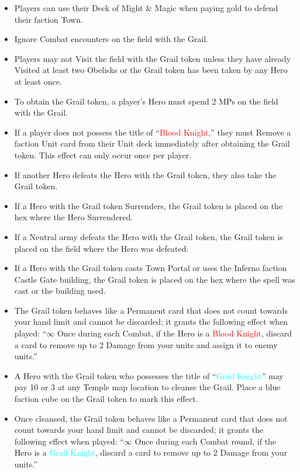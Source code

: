 \begin{multicols*}{2}
\begin{itemize}
    \item Players can use their Deck of Might \& Magic when paying gold to defend their faction Town.
    \item Ignore Combat encounters on the field with the Grail.
    \item Players may not Visit the field with the Grail token unless they have already Visited at least two Obelisks or the Grail token has been taken by any Hero at least once.
    \item To obtain the Grail token, a player’s Hero must spend 2 MPs on the field with the Grail.
    \item If a player does not possess the title of “\textcolor{red}{Blood Knight},” they must Remove a faction Unit card from their Unit deck immediately after obtaining the Grail token. This effect can only occur once per player.
    \item If another Hero defeats the Hero with the Grail token, they also take the Grail token.
    \item If a Hero with the Grail token Surrenders, the Grail token is placed on the hex where the Hero Surrendered.
    \item If a Neutral army defeats the Hero with the Grail token, the Grail token is placed on the field where the Hero was defeated.
    \item If a Hero with the Grail token casts Town Portal or uses the Inferno faction Castle Gate building, the Grail token is placed on the hex where the spell was cast or the building used.
    \item The Grail token behaves like a Permanent card that does not count towards your hand limit and cannot be discarded; it grants the following effect when played: “$\infty$ Once during each Combat, if the Hero is a \textcolor{red}{Blood Knight}, discard a card to remove up to 2 Damage from your units and assign it to enemy units.”
    \item A Hero with the Grail token who possesses the title of “\textcolor{cyan}{Grail Knight}” may pay 10  or 3  at any Temple map location to cleanse the Grail. Place a blue faction cube on the Grail token to mark this effect.
    \item Once cleansed, the Grail token behaves like a Permanent card that does not count towards your hand limit and cannot be discarded; it grants the following effect when played: “$\infty$ Once during each Combat round, if the Hero is a \textcolor{cyan}{Grail Knight}, discard a card to remove up to 2 Damage from your units.”
\end{itemize}

\end{multicols*}
